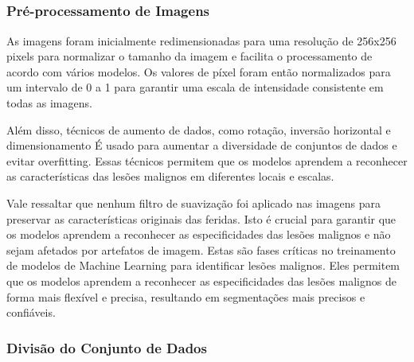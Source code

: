 \subsection{}      

    \subsubsection{Pré-processamento de Imagens}
    
        As imagens foram inicialmente redimensionadas para uma resolução de 256x256 pixels para normalizar o tamanho da imagem e facilita o processamento de acordo com vários modelos. Os valores de píxel foram então normalizados para um intervalo de 0 a 1 para garantir uma escala de intensidade consistente em todas as imagens.
    
        Além disso, técnicos de aumento de dados, como rotação, inversão horizontal e dimensionamento É usado para aumentar a diversidade de conjuntos de dados e evitar overfitting. Essas técnicos permitem que os modelos aprendem a reconhecer as características das lesões malignos em diferentes locais e escalas.
    
        Vale ressaltar que nenhum filtro de suavização foi aplicado nas imagens para preservar as características originais das feridas. Isto é crucial para garantir que os modelos aprendem a reconhecer as especificidades das lesões malignos e não sejam afetados por artefatos de imagem. Estas são fases críticas no treinamento de modelos de Machine Learning para identificar lesões malignos. Eles permitem que os modelos aprendem a reconhecer as especificidades das lesões malignos de forma mais flexível e precisa, resultando em segmentações mais precisos e confiáveis.
    
    \subsubsection{Divisão do Conjunto de Dados}
    
    
